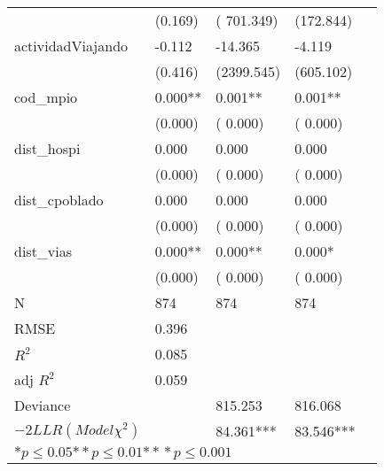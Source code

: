 \begin{tabular}{@{}l*{4}{l}@{}}
 &(0.169)&( 701.349)&(172.844)\tabularnewline
  actividadViajando & -0.112 & -14.365 & -4.119 \tabularnewline
 &(0.416)&(2399.545)&(605.102)\tabularnewline
  cod_mpio & 0.000** & 0.001** & 0.001** \tabularnewline
 &(0.000)&(   0.000)&(  0.000)\tabularnewline
  dist_hospi & 0.000 & 0.000 & 0.000 \tabularnewline
 &(0.000)&(   0.000)&(  0.000)\tabularnewline
  dist_cpoblado & 0.000 & 0.000 & 0.000 \tabularnewline
 &(0.000)&(   0.000)&(  0.000)\tabularnewline
  dist_vias & 0.000** & 0.000** & 0.000* \tabularnewline
 &(0.000)&(   0.000)&(  0.000)\tabularnewline
 \hline
 N&\multicolumn{1}{l}{874}&\multicolumn{1}{l}{874}&\multicolumn{1}{l}{874} \tabularnewline
 RMSE&0.396 & &\tabularnewline
 $R^2$&0.085 & &\tabularnewline
 adj $R^2$&0.059 & &\tabularnewline
 Deviance& &815.253 &816.068\tabularnewline
 $-2LLR (Model \chi^2)$  &  &   84.361*** &   83.546*** \tabularnewline
 \hline
\hline
 
 \multicolumn{4}{l}{  ${*  p}\le 0.05$${*\!\!*  p}\le 0.01$${*\!\!*\!\!*  p}\le 0.001$}\tabularnewline
 \end{tabular}
